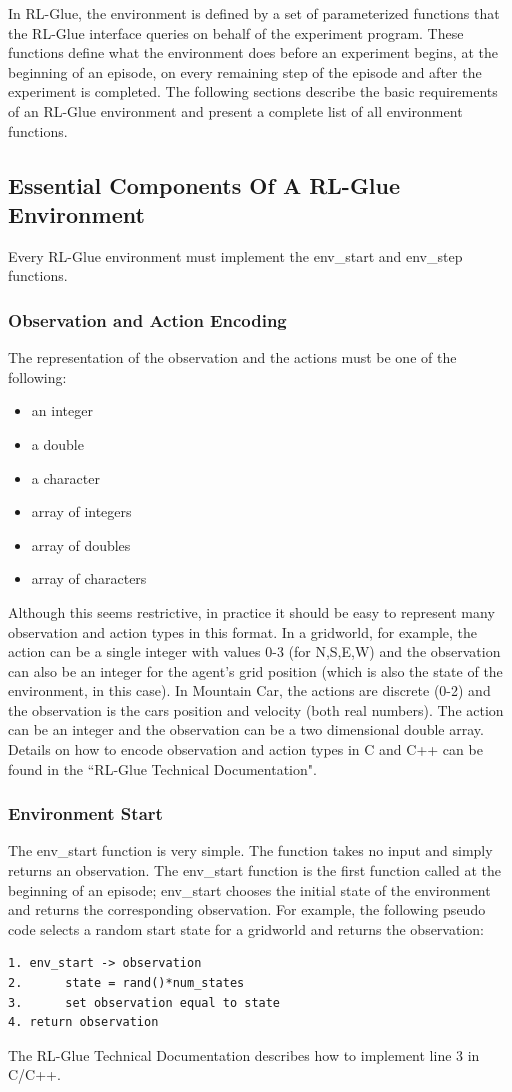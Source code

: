 \documentclass[11pt]{article}
\begin{document}
In RL-Glue, the environment is defined by a set of parameterized functions that the RL-Glue interface queries on behalf of the experiment program. These functions define what the environment does before an experiment begins, at the beginning of an episode, on every remaining step of the episode and after the experiment is completed. The following sections describe the basic requirements of an RL-Glue environment and present a complete list of all environment functions.

\subsection{Essential Components Of A RL-Glue Environment}
\label{envp1}

Every RL-Glue environment must implement the env\_start and env\_step functions.   

\subsubsection{Observation and Action Encoding}
The representation of the observation and the actions must be one of the following: 
\begin{itemize}
\item an integer
\item a double
\item a character
\item array of integers
\item array of doubles
\item array of characters
\end{itemize}
Although this seems restrictive, in practice it should be easy to represent many observation and action types in this format. In a gridworld, for example, the action can be a single integer with values 0-3 (for N,S,E,W) and the observation can also be an integer for the agent's grid position (which is also the state of the environment, in this case). In Mountain Car, the actions are discrete (0-2) and the observation is the cars position and velocity (both real numbers). The action can be an integer and the observation can be a two dimensional double array. Details on how to encode observation and action types in C and C++ can be found in the ``RL-Glue Technical Documentation".

\subsubsection{Environment Start}
The env\_start function is very simple. The function takes no input and simply returns an observation. The env\_start function is the first function called at the beginning of an episode; env\_start chooses the initial state of the environment and returns the corresponding observation. For example, the following pseudo code selects a random start state for a gridworld and returns the observation:
\begin{verbatim}
1. env_start -> observation
2.      state = rand()*num_states
3.      set observation equal to state
4. return observation
\end{verbatim}
The RL-Glue Technical Documentation describes how to implement line 3 in C/C++.
\end{document}
